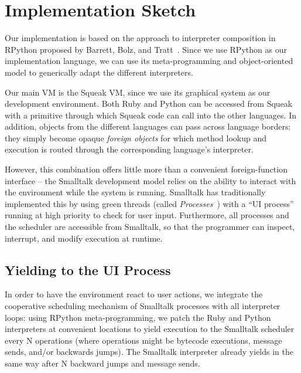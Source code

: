 \documentclass[10pt,numbers]{sigplanconf}
\begin{document}
\section{Implementation Sketch}

Our implementation is based on the approach to interpreter composition in
RPython proposed by Barrett, Bolz, and Tratt~\cite{barrett2015approaches}. Since
we use RPython as our implementation language, we can use its meta-programming
and object-oriented model to generically adapt the different interpreters.

Our main VM is the Squeak VM, since we use its graphical system as our
development environment. Both Ruby and Python can be accessed from Squeak with a
primitive through which Squeak code can call into the other languages. In
addition, objects from the different languages can pass across language borders:
they simply become opaque \emph{foreign objects} for which method lookup and
execution is routed through the corresponding language's interpreter.

However, this combination offers little more than a convenient foreign-function
interface -- the Smalltalk development model relies on the ability to interact
with the environment while the system is running. Smalltalk has traditionally
implemented this by using green threads (called
\emph{Processes}~\cite{Goldberg:1983:SLI:273}) with a ``UI process'' running at
high priority to check for user input. Furthermore, all processes and the
scheduler are accessible from Smalltalk, so that the programmer can inspect,
interrupt, and modify execution at runtime.

\subsection{Yielding to the UI Process}

In order to have the environment react to user actions, we integrate the
cooperative scheduling mechanism of Smalltalk processes with all interpreter
loops: using RPython meta-programming, we patch the Ruby and Python interpreters
at convenient locations to yield execution to the Smalltalk scheduler every N
operations (where operations might be bytecode executions, message sends, and/or
backwards jumps). The Smalltalk interpreter already yields in the same way after
N backward jumps and message sends. %
\end{document}
